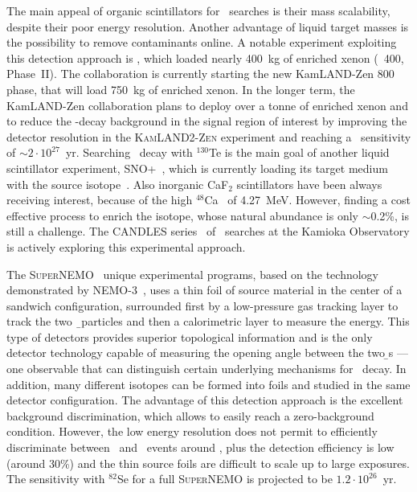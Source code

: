 \begin{description}[wide]
  \item[Scintillators] The main appeal of organic scintillators for \onbb\ searches is
    their mass scalability, despite their poor energy resolution.  Another advantage of
    liquid target masses is the possibility to remove contaminants online. A notable
    experiment exploiting this detection approach is \kamlandzen, which loaded nearly
    400~kg of enriched xenon (\kamlandzen\ 400, Phase~II). The collaboration is currently
    starting the new KamLAND-Zen 800 phase, that will load 750~kg of enriched xenon. In
    the longer term, the KamLAND-Zen collaboration plans to deploy over a tonne of
    enriched xenon and to reduce the \nnbb-decay background in the signal region of
    interest by improving the detector resolution in the \textsc{KamLAND2-Zen} experiment and
    reaching a \thalfzero\ sensitivity of ${\sim}2 \cdot 10^{27}$~yr. Searching \onbb\
    decay with $^{130}$Te is the main goal of another liquid scintillator experiment,
    SNO+~\cite{Andringa2015}, which is currently loading its target medium with the source
    isotope~\cite{Paton2019}. Also inorganic CaF$_2$ scintillators have been always
    receiving interest, because of the high $^{48}$Ca \qbb\ of 4.27~MeV. However, finding
    a cost effective process to enrich the isotope, whose natural abundance is only
    $\sim$0.2\%, is still a challenge. The CANDLES series~\cite{Umehara2015} of \onbb\
    searches at the Kamioka Observatory is actively exploring this experimental approach.

  \item[Tracking Calorimeters] The \textsc{SuperNEMO}~\cite{Arnold2010} unique
    experimental programs, based on the technology demonstrated by
    NEMO-3~\cite{Arnold2004}, uses a thin foil of source material in the center of a
    sandwich configuration, surrounded first by a low-pressure gas tracking layer to track
    the two \b\ particles and then a calorimetric layer to measure the energy. This type
    of detectors provides superior topological information and is the only detector
    technology capable of measuring the opening angle between the two {\b}s --- one
    observable that can distinguish certain underlying mechanisms for \onbb\ decay. In
    addition, many different isotopes can be formed into foils and studied in the same
    detector configuration. The advantage of this detection approach is the excellent
    background discrimination, which allows to easily reach a zero-background condition.
    However, the low energy resolution does not permit to efficiently discriminate between
    \nnbb\ and \onbb\ events around \qbb, plus the detection efficiency is low (around
    30\%) and the thin source foils are difficult to scale up to large exposures. The
    sensitivity with $^{82}$Se for a full \textsc{SuperNEMO} is projected to be $1.2 \cdot
    10^{26}$~yr.

\end{description}

